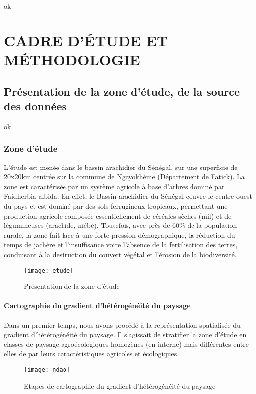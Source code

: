 \documentclass[a4paper, oneside, 12pt]{book}
\begin{document}
ok

\part{CADRE D’ÉTUDE ET MÉTHODOLOGIE}

\chapter{Présentation de la zone d'étude, de la source des données }
ok

\section{Zone d’étude}
L'étude est menée dans le bassin arachidier du Sénégal, sur une superficie de 20x20km centrée sur la commune de Ngayokhème (Département de Fatick). La zone est caractérisée par un système agricole à base d'arbres dominé par Faidherbia albida. En effet, le Bassin arachidier du Sénégal couvre le centre ouest du pays et est dominé par des sols ferrugineux tropicaux, permettant une production agricole composée essentiellement de céréales sèches (mil) et de légumineuses (arachide, niébé). Toutefois, avec près de 60\% de la population rurale, la zone fait face à une forte pression démographique, la réduction du temps de jachère et l’insuffisance voire l’absence de la fertilisation des terres, conduisant à la destruction du couvert végétal et l’érosion de la biodiversité.
\begin{figure}[H]
	\centering
	\caption{Présentation de la zone d'étude}
	\texttt{[image: etude]}	
\end{figure}

\subsection{Cartographie du gradient d’hétérogénéité du paysage}
Dans un premier temps, nous avons procédé à la représentation spatialisée du gradient d’hétérogénéité du paysage. Il s’agissait de stratifier la zone d’étude en classes de paysage agroécologiques homogènes (en interne) mais différentes entre elles de par leurs caractéristiques agricoles et écologiques. 
\begin{figure}[H]
	\centering
	\caption{Etapes de cartographie du gradient d’hétérogénéité du paysage}
	\texttt{[image: ndao]}	
\end{figure}
\end{document}
